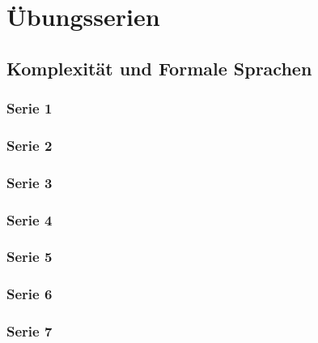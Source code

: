 \documentclass[
  a4paper,
  11pt,
]{scrartcl}
\begin{document}
\section{Übungsserien}

\subsection{Komplexität und Formale Sprachen}
\label{sub:komplexitat_und_formale_sprachen}

\subsubsection{Serie 1}
\label{sub:serie_1}




\subsubsection{Serie 2}
\label{sub:serie_2}




\subsubsection{Serie 3}
\label{sub:serie_3}




\subsubsection{Serie 4}
\label{sub:serie_4}




\subsubsection{Serie 5}
\label{sub:serie_5}




\subsubsection{Serie 6}
\label{sub:serie_6}




\subsubsection{Serie 7}
\label{sub:serie_7}
\end{document}
